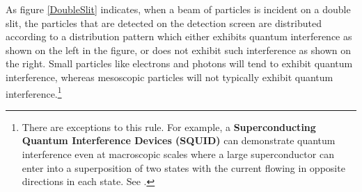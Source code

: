 \documentclass[12pt]{report}
\begin{document}
    As figure \ref{DoubleSlit} indicates, when a beam of particles is incident on a double slit, the particles that are detected on the detection screen are distributed according to a distribution pattern which either exhibits quantum interference as shown on the left in the figure, or does not exhibit such interference as shown on the right. Small particles like electrons and photons will tend to exhibit quantum interference, whereas mesoscopic particles  will not typically exhibit quantum interference.\footnote{There are exceptions to this rule. For example, a \textbf{Superconducting Quantum Interference Devices (SQUID)}  can demonstrate quantum interference even at macroscopic scales where a large superconductor can enter into a superposition of two states with the current flowing in opposite directions in each state. See \cite[ch. 6]{Schlosshauer}.}  
\end{document}
